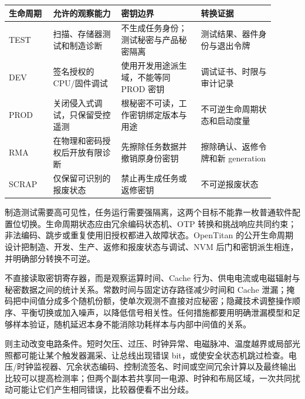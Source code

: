 \begin{longtable}{L{0.15\linewidth}L{0.23\linewidth}L{0.27\linewidth}L{0.25\linewidth}}
\toprule
生命周期 & 允许的观察能力 & 密钥边界 & 转换证据 \\
\midrule
TEST & 扫描、存储器测试和制造诊断 & 不生成任务身份；测试秘密与产品秘密隔离 & 测试结果、器件身份与退出令牌 \\\tablerowrule
DEV & 签名授权的 CPU/固件调试 & 使用开发用途派生域，不能等同 PROD 密钥 & 调试证书、时限与审计记录 \\\tablerowrule
PROD & 关闭侵入式调试，只保留受控遥测 & 根秘密不可读，工作密钥绑定版本与用途 & 不可逆生命周期状态和启动度量 \\\tablerowrule
RMA & 在物理和密码授权后开放有限诊断 & 先擦除任务数据并撤销原身份密钥 & 擦除确认、返修令牌和新 generation \\\tablerowrule
SCRAP & 仅保留可识别的报废状态 & 禁止再生成任务或返修密钥 & 不可逆报废状态 \\
\bottomrule
\end{longtable}

制造测试需要高可见性，任务运行需要强隔离，这两个目标不能靠一枚普通软件配置位切换。生命周期状态应由冗余编码状态机、OTP 转换和挑战响应共同约束；非法编码、跳步或重复使用旧授权都进入故障状态。OpenTitan 的公开生命周期设计把制造、开发、生产、返修和报废状态与调试、NVM 后门和密钥派生相连，并明确部分转换不可逆。\cite{opentitan-security-hw}


不直接读取密钥寄存器，而是观察运算时间、Cache 行为、供电电流或电磁辐射与秘密数据之间的统计关系。常数时间与固定访存路径减少时间和 Cache 泄漏；掩码把中间值分成多个随机份额，使单次观测不直接对应秘密；隐藏技术调整操作顺序、平衡切换或加入噪声，以降低信号相关性。任何措施都要用明确泄漏模型和足够样本验证，随机延迟本身不能消除功耗样本与内部中间值的关系。

则主动改变电路条件。短时欠压、过压、时钟异常、电磁脉冲、温度越界或局部光照都可能让某个触发器漏采、让总线出现错误 bit，或使安全状态机跳过检查。电压/时钟监视器、冗余状态编码、控制流签名、时间或空间冗余计算以及最终输出比较可以提高检测率；但两个副本若共享同一电源、时钟和布局区域，一次共同扰动可能让它们产生相同错误，比较器便看不出分歧。

